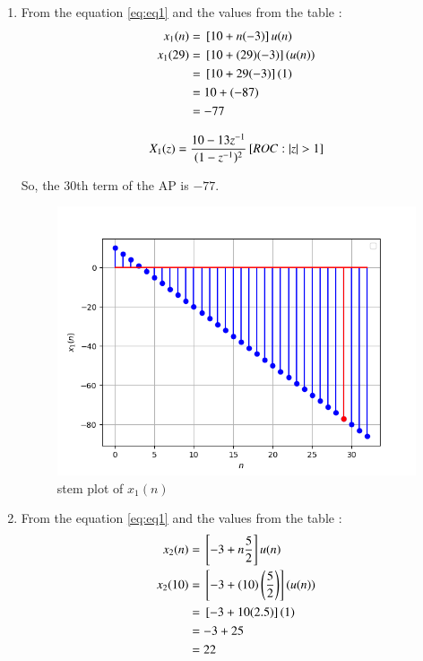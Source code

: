 \documentclass[journal,12pt,twocolumn]{IEEEtran}
\theoremstyle{remark}
\begin{document}
\begin{enumerate}
\item From the equation \eqref{eq:eq1} and the values from the table  :
\begin{align}
x_1(n) &= {}\left[10 + n(-3)\right]u(n)\\
x_1(29) &= {}\left[10 + (29)(-3)\right](u(n))\\
&= {}\left[10 + 29(-3)\right](1)\\
&= 10+ (-87)  \\
&= -77
\end{align}
               
\begin{align}
X_1(z) = \frac{10 - 13z^{-1}}{(1-z^{-1})^2} {}\left[ROC : |z| > 1\right]
\end{align}

So, the 30th term of the AP is $-77$.\\
\begin{figure}[h!]
    \centering
    \includegraphics[width=\columnwidth]{figs/plot1.png}
    \caption{stem plot of $x_1(n)$}
    \label{fig:1}
\end{figure}

\item From the equation \eqref{eq:eq1} and the values from the table  :
\begin{align}
x_2(n) &= {}\left[-3 + n\frac{5}{2}\right]u(n)\\
x_2(10) &= {}\left[-3 + (10)\left(\frac{5}{2}\right)\right](u(n))\\
&= {}\left[-3 + 10(2.5)\right](1)\\
& = -3 + 25 \\
&= 22
\end{align}


\end{enumerate}
\end{document}
